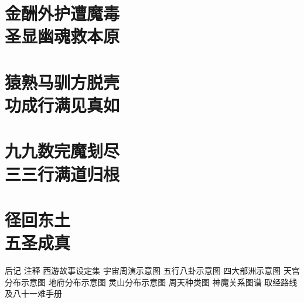 \documentclass[a4paper,12pt,UTF8,twoside]{ctexbook}
\begin{document}
\chapter[金酬外护遭魔毒\ 圣显幽魂救本原]{金酬外护遭魔毒\\圣显幽魂救本原}
\chapter[猿熟马驯方脱壳\ 功成行满见真如]{猿熟马驯方脱壳\\功成行满见真如}
\chapter[九九数完魔刬尽\ 三三行满道归根]{九九数完魔刬尽\\三三行满道归根}
\chapter[径回东土\ 五圣成真]{径回东土\\五圣成真}













\backmatter

后记
注释
西游故事设定集
宇宙周演示意图
五行八卦示意图
四大部洲示意图
天宫分布示意图
地府分布示意图
灵山分布示意图
周天种类图
神魔关系图谱
取经路线及八十一难手册
\end{document}

